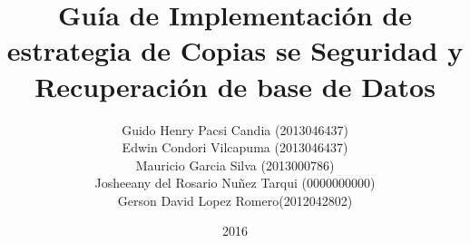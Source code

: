 \documentclass[a4paper,20pt]{report}
\title{Guía de Implementación de estrategia de Copias se Seguridad y Recuperación de base de Datos}
\author{Guido Henry Pacsi Candia (2013046437)\\Edwin Condori Vilcapuma (2013046437)\\Mauricio Garcia Silva (2013000786)\\Josheeany del Rosario Nuñez Tarqui (0000000000)\\Gerson David Lopez  Romero(2012042802)}
\date{2016}
\begin{document}
\maketitle 

\doublespacing

\tableofcontents %

\listoftables %
\listoffigures %








\renewcommand{\bibname}{BIBLIOGRAFIA}



\renewcommand\appendixname{Anexo}
\appendix

\end{document}
